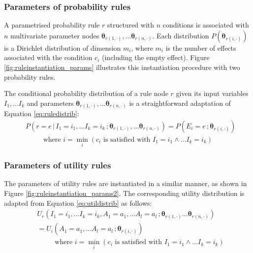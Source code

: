 \subsubsection*{Parameters of probability rules}

A parametrised probability rule $r$ structured with $n$ conditions is associated with $n$ multivariate parameter nodes $\boldsymbol\theta_{r(1, \cdot)}, ... \boldsymbol\theta_{r(n, \cdot)}$.  Each distribution $P(\boldsymbol\theta_{r(i, \cdot)})$ is a Dirichlet distribution of dimension $m_i$, where $m_i$ is the number of effects associated with the condition $c_i$ (including the empty effect). Figure \ref{fig:ruleinstantiation_params} illustrates this instantiation procedure with two probability rules.  

The conditional probability distribution of a rule node $r$ given its input variables $I_1,...I_k$ and parameters $\boldsymbol\theta_{r(1, \cdot)}, ... \boldsymbol\theta_{r(n, \cdot)}$ is a straightforward adaptation of Equation \eqref{eq:ruledistrib}:
\begin{align}
& P(r\!=\!e \, | \, I_1\!=\!i_1,... I_k\!=\!i_k\,; \boldsymbol\theta_{r(1, \cdot)}, ... \boldsymbol\theta_{r(n, \cdot)})  = P(E_i = e\,; \boldsymbol\theta_{r(i, \cdot)}) \\
& \; \; \; \; \; \; \; \; \text{ where } i = \min_i (c_i \text{ is satisfied with } I_1\!=\!i_1 \land ... I_k\!=\!i_k) \nonumber
\end{align}

\subsubsection*{Parameters of utility rules}

The parameters of utility rules are instantiated in a similar manner, as shown in Figure \ref{fig:ruleinstantiation_params2}. The corresponding utility distribution is adapted from Equation \ref{eq:utildistrib} as follows:
\begin{align}
& U_r(I_1\!=\!i_1,... I_k\!=\!i_k, A_1\!=\!a_1,... A_l\!=\!a_l\,; \boldsymbol\theta_{r(1, \cdot)} ... \boldsymbol\theta_{r(n, \cdot)}) \nonumber \\ 
& = U_i(A_1\!=\!a_1,... A_l\!=\!a_l\,; \boldsymbol\theta_{r(i, \cdot)})  \label{eq:utildistrib}\\
& \; \; \; \; \; \; \; \; \text{ where } i = \min_i (c_i \text{ is satisfied with } I_1\!=\!i_1 \land ... I_k\!=\!i_k) \nonumber
\end{align}

